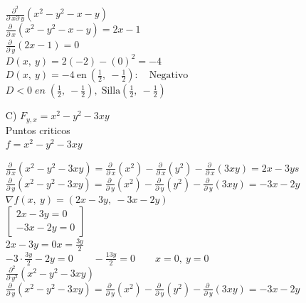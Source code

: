 \documentclass[13pt]{memoir}
\begin{document}
\begin{enumerate}
$\frac{\partial ^2}{\partial \:x\partial \:y}\left(x^2-y^2-x-y\right)$\\
$\frac{\partial \:}{\partial \:x}\left(x^2-y^2-x-y\right)=2x-1 $\\
$\frac{\partial \:}{\partial \:y}\left(2x-1\right) = 0 $\\

$D\left(x,\:y\right)=2\left(-2\right)-\left(0\right)^2 = -4$\\
$D\left(x,\:y\right)=-4\mathrm{\:en\:}\left(\frac{1}{2},\:-\frac{1}{2}\right):\quad \mathrm{Negativo}$\\
$D<0 \;en \; \left(\frac{1}{2},\:-\frac{1}{2}\right), \; \mathrm{Silla}\left(\frac{1}{2},\:-\frac{1}{2}\right)$\\

\item[ C)] $F_{y,x}= x^2-y^2-3xy$\\

{\tiny Puntos criticos}\\
$f=x^2-y^2-3xy$

$\frac{\partial \:}{\partial \:x}\left(x^2-y^2-3xy\right) =\frac{\partial \:}{\partial \:x}\left(x^2\right)-\frac{\partial \:}{\partial \:x}\left(y^2\right)-\frac{\partial \:}{\partial \:x}\left(3xy\right) =2x-3ys$\\
$\frac{\partial \:}{\partial \:y}\left(x^2-y^2-3xy\right) =\frac{\partial \:}{\partial \:y}\left(x^2\right)-\frac{\partial \:}{\partial \:y}\left(y^2\right)-\frac{\partial \:}{\partial \:y}\left(3xy\right) =-3x-2y$\\

$\nabla f\left(x,\:y\right)=\left(2x-3y,\:-3x-2y\right)$\\

$\begin{bmatrix}2x-3y=0\\ -3x-2y=0\end{bmatrix} $\\

$2x-3y=0 x=\frac{3y}{2}$\\
$-3\cdot \frac{3y}{2}-2y=0 \qquad -\frac{13y}{2}=0 \qquad x=0,\:y=0$\\ 

$\frac{\partial ^2}{\partial \:y^2}\left(x^2-y^2-3xy\right) $ \\ 
$\frac{\partial \:}{\partial \:y}\left(x^2-y^2-3xy\right) =\frac{\partial \:}{\partial \:y}\left(x^2\right)-\frac{\partial \:}{\partial \:y}\left(y^2\right)-\frac{\partial \:}{\partial \:y}\left(3xy\right) =-3x-2y$ \\ 


\end{enumerate}
\end{document}
